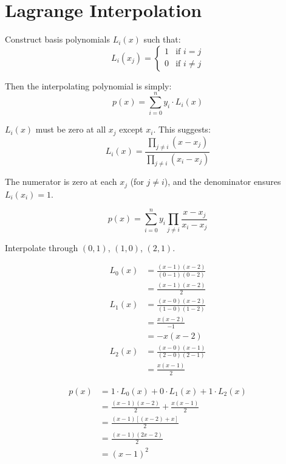 \newpage
\section{Lagrange Interpolation}

 Construct basis polynomials $L_i(x)$ such that:
\begin{equation}
    L_i(x_j) = \begin{cases} 1 & \text{if } i = j \\ 0 & \text{if } i \neq j \end{cases}
\end{equation}

Then the interpolating polynomial is simply:
\begin{equation}
    p(x) = \sum_{i=0}^{n} y_i \cdot L_i(x)
\end{equation}


$L_i(x)$ must be zero at all $x_j$ except $x_i$. This suggests:
\begin{equation}
    L_i(x) = \frac{\prod_{j \neq i} (x - x_j)}{\prod_{j \neq i} (x_i - x_j)}
\end{equation}

The numerator is zero at each $x_j$ (for $j \neq i$), and the denominator ensures $L_i(x_i) = 1$.

\begin{equation}
    \boxed{p(x) = \sum_{i=0}^{n} y_i \prod_{j \neq i} \frac{x - x_j}{x_i - x_j}}
\end{equation}

 Interpolate through $(0, 1)$, $(1, 0)$, $(2, 1)$.

\begin{align*}
    L_0(x) &= \frac{(x-1)(x-2)}{(0-1)(0-2)} \\
    &= \frac{(x-1)(x-2)}{2} \\[6pt]
    L_1(x) &= \frac{(x-0)(x-2)}{(1-0)(1-2)} \\
    &= \frac{x(x-2)}{-1} \\
    &= -x(x-2) \\[6pt]
    L_2(x) &= \frac{(x-0)(x-1)}{(2-0)(2-1)} \\
    &= \frac{x(x-1)}{2}
\end{align*}

\begin{align*}
    p(x) &= 1 \cdot L_0(x) + 0 \cdot L_1(x) + 1 \cdot L_2(x) \\
    &= \frac{(x-1)(x-2)}{2} + \frac{x(x-1)}{2} \\
    &= \frac{(x-1)[(x-2) + x]}{2} \\
    &= \frac{(x-1)(2x-2)}{2} \\
    &= (x-1)^2
\end{align*}

